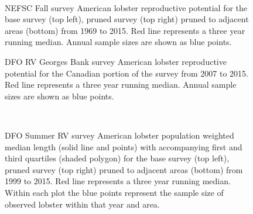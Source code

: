 \documentclass[11pt]{article}
\newcommand{\D}{.}
\newcommand{\e}{/backup/bio_data/bio.lobster/figures/} %
\begin{document}
\begin{figure}
\centering
{}\\
\caption{NEFSC Fall survey American lobster reproductive potential for the base survey (top left), pruned survey (top right) pruned to adjacent areas (bottom) from 1969 to 2015. Red line represents a three year running median. Annual sample sizes are shown as blue points.  }
\end{figure}
\clearpage


\begin{figure}

    \caption{DFO RV Georges Bank survey American lobster reproductive potential for the Canadian portion of the survey from 2007 to 2015. Red line represents a three year running median. Annual sample sizes are shown as blue points.  }

\end{figure}







\begin{figure}
\centering
{}\\
\caption{DFO Summer RV survey American lobster population weighted median length (solid line and points) with accompanying first and third quartiles (shaded polygon) for the base survey (top left), pruned survey (top right) pruned to adjacent areas (bottom) from 1999 to 2015. Red line represents a three year running median. Within each plot the blue points represent the sample size of observed lobster within that year and area.}
\end{figure}
\clearpage
\end{document}
